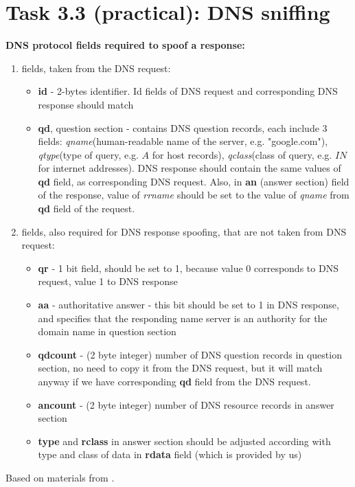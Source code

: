 \documentclass{article}
\begin{document}
\section*{Task 3.3 (practical): DNS sniffing}
\textbf{DNS protocol fields required to spoof a response:}
\begin{enumerate}
\item fields, taken from the DNS request:
\begin{itemize}
\item \textbf{id} - 2-bytes identifier. Id fields of DNS request and corresponding DNS response should match
\item \textbf{qd}, question section - contains DNS question records, each include 3 fields: \textit{qname}(human-readable name of the server, e.g. "google.com"), \textit{qtype}(type of query, e.g. $A$ for host records), \textit{qclass}(class of query, e.g. $IN$ for internet addresses). DNS response should contain the same values of \textbf{qd} field, as corresponding DNS request. Also, in \textbf{an} (answer section) field of the response, value of \textit{rrname} should be set to the value of \textit{qname} from \textbf{qd} field of the request.
\end{itemize}
\item fields, also required for DNS response spoofing, that are not taken from DNS request:
\begin{itemize}
\item \textbf{qr} - 1 bit field, should be set to 1, because value 0 corresponds to DNS request, value 1 to DNS response
\item \textbf{aa} - authoritative answer - this bit should be set to 1 in DNS response, and specifies that the responding name server is an authority for the domain name in question section
\item \textbf{qdcount} - (2 byte integer) number of DNS question records in question section, no need to copy it from the DNS request, but it will match anyway if we have corresponding  \textbf{qd} field from the DNS request.
\item \textbf{ancount} - (2 byte integer) number of DNS resource records in answer section
\item \textbf{type} and \textbf{rclass} in answer section should be adjusted according with type and class of data in \textbf{rdata} field (which is provided by us)
\end{itemize}
\end{enumerate}
Based on materials from \cite{dnsframe}.
\end{document}

